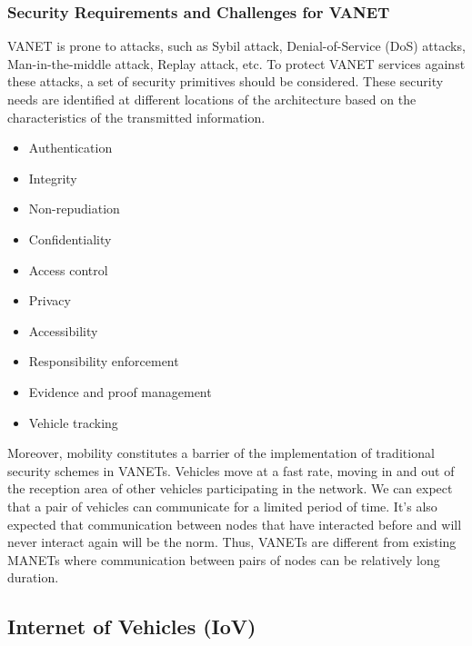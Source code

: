 			\subsubsection{Security Requirements and Challenges for VANET \cite{paul2016intelligent}}
			VANET is prone to attacks, such as Sybil attack, Denial-of-Service (DoS) attacks, Man-in-the-middle attack, Replay attack, etc. To protect VANET services against these attacks, a set of security primitives should be considered. These security needs are identified at different locations of the architecture based on the characteristics of the transmitted information. 
			\begin{itemize}
				\let\labelitemi\labelitemii
				\item Authentication
				\item Integrity
				\item Non-repudiation
				\item Confidentiality
				\item Access control
				\item Privacy
				\item Accessibility
				\item Responsibility enforcement
				\item Evidence and proof management
				\item Vehicle tracking
			\end{itemize}
			Moreover, mobility constitutes a barrier of the implementation of traditional security schemes in VANETs. Vehicles move at a fast rate, moving in and out of the reception area of other vehicles participating in the network. We can expect that a pair of vehicles can communicate for a limited period of time. It’s also expected that communication between nodes that have interacted before and will never interact again will be the norm. Thus, VANETs are different from existing MANETs where communication between pairs of nodes can be relatively long duration. 
			
			\newpage
			\subsection{Internet of Vehicles (IoV)}
